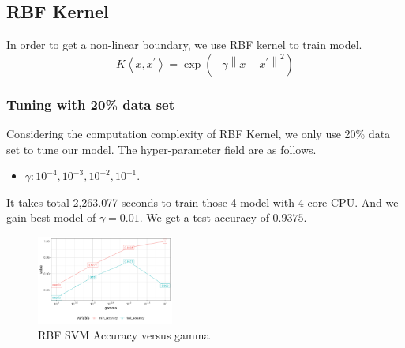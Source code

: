 \documentclass[conference]{IEEEtran}
\begin{document}
\subsection{RBF Kernel}
In order to get a non-linear boundary, we use RBF kernel to train model.
$$
K\left\langle x, x^{\prime}\right\rangle=\exp \left(-\gamma\left\|x-x^{\prime}\right\|^{2}\right) 
$$

\subsubsection{Tuning with 20\% data set}
Considering the computation complexity of RBF Kernel, we only use 20\% data set to tune our model. The hyper-parameter field are as follows.
\begin{itemize}
  \item $\gamma:10^{-4},10^{-3},10^{-2},10^{-1}$.
\end{itemize}

It takes total 2,263.077 seconds to train those 4 model with 4-core CPU. And we gain best model of $\gamma=0.01$. We get a test accuracy of $0.9375$.

\begin{figure}[htbp]
\centerline{\includegraphics[width=0.4\textwidth]{figure/RBF SVM Accuracy versus gamma.png}}
\caption{RBF SVM Accuracy versus gamma}
\label{RBF SVM Accuracy versus gamma}
\end{figure}
\end{document}
